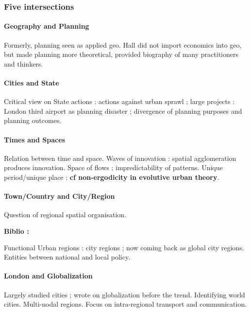 \subsubsection{Five intersections}

\paragraph{Geography and Planning}

Formerly, planning seen as applied geo. Hall did not import economics into geo, but made planning more theoretical, provided biography of many practitioners and thinkers.

\paragraph{Cities and State}

Critical view on State actions : actions against urban sprawl ; large projects : London third airport as planning disaster ; divergence of planning purposes and planning outcomes.

\paragraph{Times and Spaces}

Relation between time and space. Waves of innovation : spatial agglomeration produces innovation. Space of flows ; impredictability of patterns. Unique period/unique place : \textbf{cf non-ergodicity in evolutive urban theory}.

\paragraph{Town/Country and City/Region}

Question of regional spatial organisation.

\textbf{Biblio : } \cite{hall2006polycentric}

Functional Urban regions : city regions ; now coming back as global city regions. Entities between national and local policy.

\paragraph{London and Globalization}

Largely studied cities ; wrote on globalization before the trend. Identifying world cities. Multi-nodal regions. Focus on intra-regional transport and communication.

